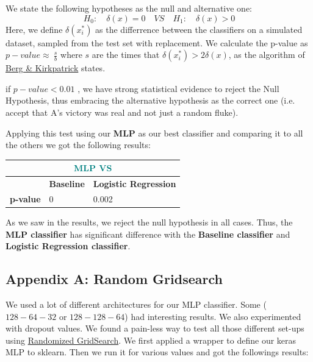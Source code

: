 \documentclass[10pt]{article}
\begin{document}
We state the following hypotheses as the null and alternative one:
\[ 
H_0: \quad \delta(x) = 0 \quad VS \quad H_1: \quad \delta(x) >0
\]
Here, we define $\delta(x^*_i)$ as the differrence between the classifiers on a simulated dataset, sampled from the test set with replacement. 
We calculate the p-value as $p-value \approx\ \frac{s}{b}$ where $s$ are the times that $\delta(x^*_i) > 2\delta(x)$, as the algorithm of \href{http://nlp.cs.berkeley.edu/pubs/BergKirkpatrick-Burkett-Klein_2012_Significance_paper.pdf}{Berg \& Kirkpatrick} states.

if $p-value< 0.01$ , we have strong statistical evidence to reject the Null Hypothesis, thus embracing the alternative hypothesis as the correct one (i.e. accept that A’s victory was real and not just a random fluke).

Applying this test using our \textbf{MLP} as our best classifier and comparing it to all the others we got the following results:

\bigskip
\begin{tabular}{ |p{2cm}||p{4cm}|p{4cm}| }
 \hline
 \multicolumn{3}{|c|}{\textcolor{teal}{MLP  VS}} \\
 \hline
   & \textbf{Baseline} &  \textbf{Logistic Regression} \\
 \hline
 \textbf{p-value} & 0    & 0.002  \\
 \hline
  \hline
\end{tabular}

\bigskip
As we saw in the results, we reject the null hypothesis in all cases. Thus,
the \textbf{MLP classifier} has significant difference with the \textbf{Baseline classifier} and \textbf{Logistic Regression classifier}.

\newpage

\subsection*{Appendix A: Random Gridsearch} 
We used a lot of different architectures for our MLP classifier. Some ($128-64-32$ or $128-128-64$) had interesting results. We also experimented with dropout values. We found a pain-less way to test all those different set-ups using \href{https://scikit-learn.org/stable/modules/generated/sklearn.model_selection.RandomizedSearchCV.html}{Randomized GridSearch}. 
We first applied a wrapper to define our keras MLP to sklearn. Then we run it for various values and got the followings results:
\end{document}
